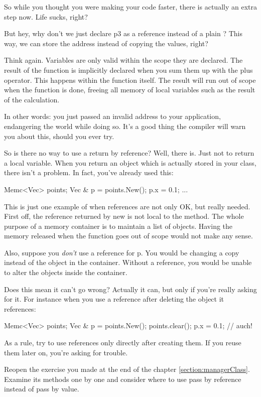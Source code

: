 So while you thought you were making your code faster, there is actually an extra step now. Life sucks, right?

But hey, why don't we just declare p3 as a reference instead of a plain ? This way, we can store the address instead of copying the values, right? 

Think again. Variables are only valid within the scope they are declared. The result of the function  is implicitly declared when you sum them up with the plus operator. This happens within the function itself. The result will run out of scope when the function is done, freeing all memory of local variables such as the result of the calculation.

In other words: you just passed an invalid address to your application, endangering the world while doing so. It's a good thing the compiler will warn you about this, should you ever try.

So is there no way to use a return by reference? Well, there is. Just not to return a local variable. When you return an object which is actually stored in your class, there isn't a problem. In fact, you've already used this:

\begin{code}
Memc<Vec> points;
Vec & p = points.New();
p.x = 0.1;
...
\end{code}

This is just one example of when references are not only OK, but really needed. First off, the reference returned by new is not local to the method. The whole purpose of a memory container is to maintain a list of objects. Having the memory released when the function goes out of scope would not make any sense. 

Also, suppose you \textsl{don't} use a reference for p. You would be changing a copy instead of the object in the container. Without a reference, you would be unable to alter the objects inside the container.

Does this mean it can't go wrong? Actually it can, but only if you're really asking for it. For instance when you use a reference after deleting the object it references:

\begin{code}
Memc<Vec> points;
Vec & p = points.New();
points.clear();
p.x = 0.1; // auch!
\end{code}

As a rule, try to use references only directly after creating them. If you reuse them later on, you're asking for trouble.

\begin{exercise}
Reopen the exercise you made at the end of the chapter \ref{section:managerClass}. Examine its methods one by one and consider where to use pass by reference instead of pass by value.
\end{exercise}

